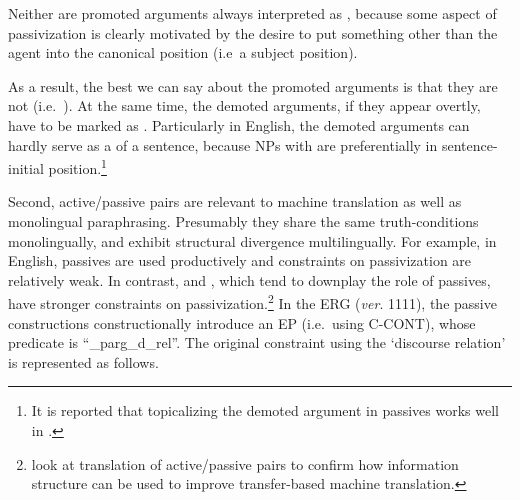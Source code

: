 
 
\noindent Neither are promoted arguments always interpreted as
, because some aspect of passivization is clearly motivated
by the desire to put something other than the agent into the canonical
 position (i.e\ a subject position).



\noindent As a result, the best we can say about the promoted
arguments is that they are not 
(i.e.\ ). At the same time, the demoted arguments,
if they appear overtly, have to be marked as
. Particularly in English, the demoted arguments can
hardly serve as a  of a sentence, because NPs with
 are preferentially in sentence-initial
position.\footnote{It is reported that topicalizing the demoted
  argument in passives works well in .}


Second, active/passive pairs are relevant to machine translation as
well as monolingual paraphrasing. Presumably they share the same
truth-conditions monolingually, and exhibit
structural divergence multilingually. For example, in English,
passives are used productively and constraints on passivization are
relatively weak. In contrast,  and , which
tend to downplay the role of passives, have stronger
constraints on passivization.\footnote{\citet{song:bender:11} look at
  translation of active/passive pairs to confirm how information
  structure can be used to improve transfer-based machine
  translation.} In the ERG (\textit{ver}. 1111), the passive
constructions constructionally introduce an EP (i.e.\ using C-CONT),
whose predicate is ``\_parg\_d\_rel''.  The original constraint using
the `discourse relation' is represented as follows.




